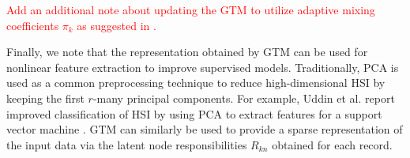 \textcolor{red}{Add an additional note about updating the GTM to utilize
  adaptive mixing coefficients $\pi_k$ as suggested in \cite{gtm-orig, gtm-developments}.}

Finally, we note that the representation obtained by  GTM can be used for
nonlinear feature extraction to improve supervised models. Traditionally, PCA is
used as a common preprocessing technique to reduce high-dimensional HSI by
keeping the first $r$-many principal components. For example, Uddin et al.
report improved classification of HSI by using PCA to extract features for a
support vector machine \cite{uddin2021pca}.  GTM can similarly be used to
provide a sparse representation of the input data via the latent node
responsibilities $R_{kn}$ obtained for each record.


